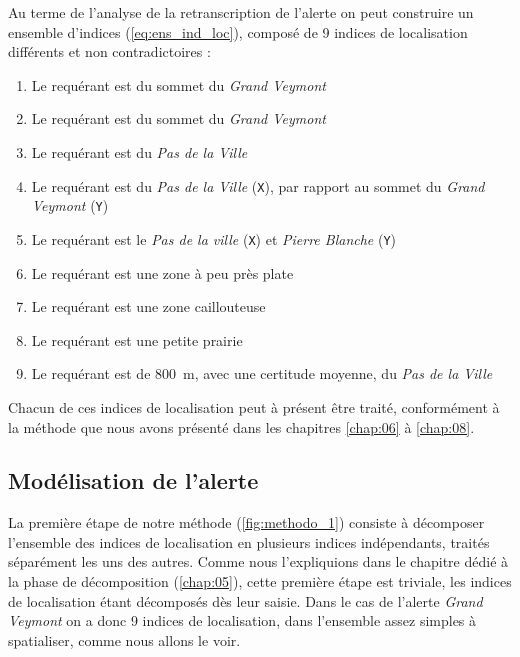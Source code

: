 Au terme de l'analyse de la retranscription de l'alerte on peut
construire un ensemble d'indices (\autoref{eq:ens_ind_loc}), composé
de 9 indices de localisation différents et non contradictoires :
% 
\begin{enumerate}
\item \label{ind:gv1} Le requérant est
   du sommet du \emph{Grand Veymont}
\item \label{ind:gv2} Le requérant est  du
  sommet du \emph{Grand Veymont}
\item \label{ind:gv3} Le requérant est
   du \emph{Pas de la Ville}
\item \label{ind:gv4} Le requérant est  du \emph{Pas de
    la Ville} (\texttt{X}), par rapport au sommet du \emph{Grand
    Veymont} (\texttt{Y})
\item \label{ind:gv5} Le requérant est  le
  \emph{Pas de la ville} (\texttt{X}) et \emph{Pierre Blanche}
  (\texttt{Y})
\item \label{ind:gv6} Le requérant est 
  une zone à peu près plate
\item \label{ind:gv7} Le requérant est 
  une zone caillouteuse
\item \label{ind:gv8} Le requérant est 
  une petite prairie
\item \label{ind:gv9} Le requérant est
   de \SI{800}{\meter}, avec une
  certitude moyenne, du \emph{Pas de la Ville}
\end{enumerate}

Chacun de ces indices de localisation peut à présent être traité,
conformément à la méthode que nous avons présenté dans les chapitres
\ref{chap:06} à \ref{chap:08}.

\subsection{Modélisation de l'alerte}
\label{subsec:9-2-2}

La première étape de notre méthode (\autoref{fig:methodo_1}) consiste
à décomposer l'ensemble des indices de localisation en plusieurs
indices indépendants, traités séparément les uns des autres. Comme
nous l'expliquions dans le chapitre dédié à la phase de décomposition
(\autoref{chap:05}), cette première étape est triviale, les indices de
localisation étant décomposés dès leur saisie. Dans le cas de l'alerte
\emph{Grand Veymont} on a donc 9 indices de localisation, dans
l'ensemble assez simples à spatialiser, comme nous allons le voir.

